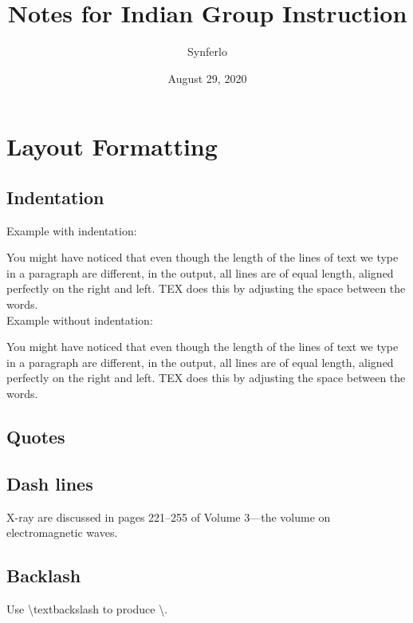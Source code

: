 \documentclass[12pt]{article}
\title{Notes for Indian Group Instruction}
\author{Synferlo}
\date{August 29, 2020}
\begin{document}
    \maketitle

    \newpage
    \section{Layout Formatting}
        \subsection{Indentation}
            
            Example with indentation:

            You might have noticed that even though the length of the lines of text we type in a
            paragraph are different, in the output, all lines are of equal length, aligned perfectly on
            the right and left. TEX does this by adjusting the space between the words.\\

            Example without indentation:

            \noindent You might have noticed that even though the length of the lines of text we type in a
            paragraph are different, in the output, all lines are of equal length, aligned perfectly on
            the right and left. TEX does this by adjusting the space between the words.

        \subsection{Quotes}

        \subsection{Dash lines}
            X-ray are discussed in pages 221--255 of Volume 3---the volume on electromagnetic waves.
        
        \subsection{Backlash}
            Use \textbackslash textbackslash to produce \textbackslash.
\end{document}

